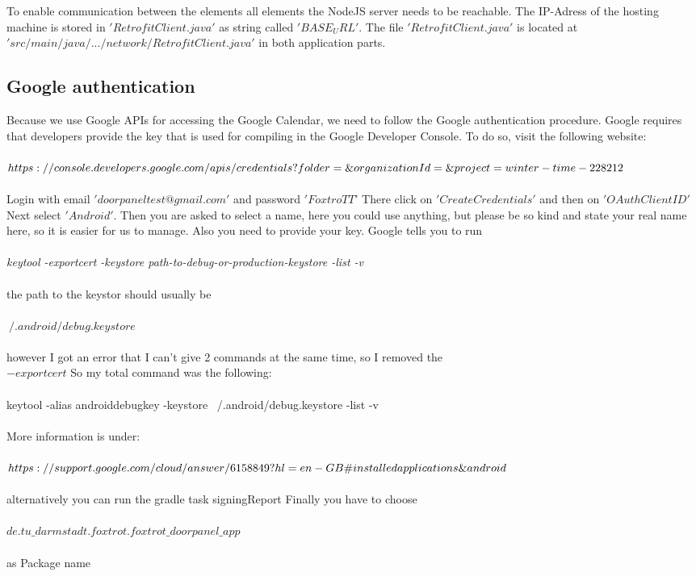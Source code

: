 \documentclass[article,colorback,accentcolor=tud4c, 11pt]{tudreport}
\begin{document}
To enable communication between the elements all elements the NodeJS server needs to be reachable. The IP-Adress of the hosting machine is stored in $'RetrofitClient.java'$ as string called $'BASE_URL'$. The file $'RetrofitClient.java'$ is located at $'src/main/java/.../network/RetrofitClient.java'$ in both application parts.
	
	
\subsection{Google authentication}
Because we use Google APIs for accessing the Google Calendar, we need to follow the Google authentication procedure.
Google requires that developers provide the key that is used for compiling in the Google Developer Console.
To do so, visit the following website:\\ \\
$https://console.developers.google.com/apis/credentials?folder\\=\&organizationId=\&project=winter-time-228212$\\ \\
Login with email $'doorpaneltest@gmail.com'$ and password $'FoxtroTT$'
There click on $'Create Credentials'$ and then on $'OAuth Client ID'$ Next select $'Android'$.
Then you are asked to select a name, here you could use anything, but please be so kind and state your real name here, so it is easier for us to manage.
Also you need to provide your key. Google tells you to run\\ \\
\textit{keytool -exportcert -keystore path-to-debug-or-production-keystore -list -v} \\ \\
the path to the keystor should usually be\\ \\ $~/.android/debug.keystore$ \\ \\
however I got an error that I can't give 2 commands at the same time, so I removed the \\$-exportcert$
So my total command was the following:\\ \\
keytool -alias androiddebugkey -keystore ~/.android/debug.keystore -list -v\\ \\
More information is under:\\ \\
$https://support.google.com/cloud/answer/6158849?hl=en-GB\#\\installedapplications\&android$\\ \\
alternatively you can run the gradle task signingReport
Finally you have to choose\\ \\$de.tu\_darmstadt.foxtrot.foxtrot\_doorpanel\_app$\\ \\ as Package name	
\end{document}
